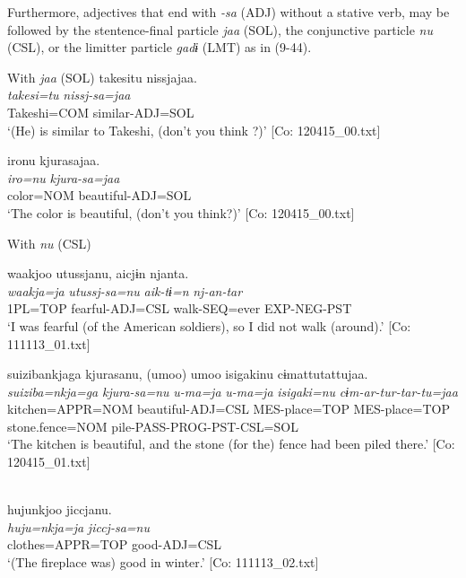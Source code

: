   Furthermore, adjectives that end with \textit{-sa} (ADJ) without a stative verb, may be followed by the stentence-final particle \textit{jaa} (SOL), the conjunctive particle \textit{nu} (CSL), or the limitter particle \textit{gadɨ} (LMT) as in (9-44).

\ea   With \textit{jaa} (SOL) \label{ex:9.44}
\ea %
 \glll  takesitu  nissjajaa.\\
      \textit{takesi=tu}  \textit{nissj-sa=jaa}\\
      Takeshi=COM  similar-ADJ=SOL\\
      \glt       ‘(He) is similar to Takeshi, (don’t you think ?)’ [Co: 120415\_00.txt]

\ex \label{ex:9.44b} %
    \glll  {\textbar}iro{\textbar}nu  kjurasajaa.\\
      \textit{iro=nu}  \textit{kjura-sa=jaa}\\
      color=NOM  beautiful-ADJ=SOL\\
      \glt       ‘The color is beautiful, (don’t you think?)’ [Co: 120415\_00.txt]

\exi{}  With \textit{nu} (CSL)

\ex \label{ex:9.44c} %
    \glll  waakjoo  utussjanu,  aicjɨn  njanta.\\
      \textit{waakja=ja}  \textit{utussj-sa=nu}  \textit{aik-tɨ=n}  \textit{nj-an-tar}\\
      1PL=TOP  fearful-ADJ=CSL  walk-SEQ=ever  EXP-NEG-PST\\
      \glt       ‘I was fearful (of the American soldiers), so I did not walk (around).’ [Co: 111113\_01.txt]

\ex \label{ex:9.44d} %
 \glll  {\textbar}suiziba{\textbar}nkjaga  kjurasanu,  (umoo)  umoo  isigakinu  cɨmattutattujaa.\\
      \textit{suiziba=nkja=ga}  \textit{kjura-sa=nu}  \textit{u-ma=ja}  \textit{u-ma=ja}  \textit{isigaki=nu}  \textit{cɨm-ar-tur-tar-tu=jaa}\\
      kitchen=APPR=NOM  beautiful-ADJ=CSL  MES-place=TOP   MES-place=TOP  stone.fence=NOM  pile-PASS-PROG-PST-CSL=SOL      \\
      \glt       ‘The kitchen is beautiful, and the stone (for the) fence had been piled there.’ [Co: 120415\_01.txt]

\ex{}\\
    \glll  hujunkjoo  jiccjanu.\\
      \textit{huju=nkja=ja}  \textit{jiccj-sa=nu}\\
      clothes=APPR=TOP  good-ADJ=CSL\\
      \glt       ‘(The fireplace was) good in winter.’ [Co: 111113\_02.txt]

